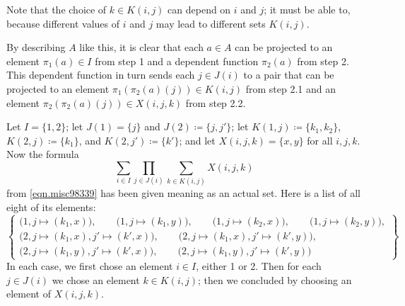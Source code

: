 \documentclass[Book-Poly]{subfiles}
\begin{document}
Note that the choice of $k\in K(i,j)$ can depend on $i$ and $j$; it must be able to, because different values of $i$ and $j$ may lead to different sets $K(i,j)$.

By describing $A$ like this, it is clear that each $a \in A$ can be projected to an element $\pi_1(a) \in I$ from step 1 and a dependent function $\pi_2(a)$ from step 2.
This dependent function in turn sends each $j \in J(i)$ to a pair that can be projected to an element $\pi_1(\pi_2(a)(j)) \in K(i, j)$ from step 2.1 and an element $\pi_2(\pi_2(a)(j)) \in X(i,j,k)$ from step 2.2.

\begin{example}%
\label{ex.notation_sum_prod}

Let $I=\{1,2\}$; let $J(1)=\{j\}$ and $J(2)\coloneqq\{j,j'\}$; let $K(1,j)\coloneqq\{k_1,k_2\}$, $K(2,j)\coloneqq\{k_1\}$, and $K(2,j')\coloneqq\{k'\}$; and let $X(i,j,k)=\{x,y\}$ for all $i,j,k$. Now the formula 
\[\sum_{i\in I}\prod_{j\in J(i)}\sum_{k\in K(i,j)}X(i,j,k)\]
from \eqref{eqn.misc98339} has been given meaning as an actual set. Here is a list of all eight of its elements:
\[
\left\{
\begin{gathered}
	\big(1, j\mapsto(k_1,x)\big),\qquad
	\big(1, j\mapsto(k_1,y)\big),\qquad
	\big(1, j\mapsto(k_2,x)\big),\qquad
	\big(1, j\mapsto(k_2,y)\big),\\
	\big(2, j\mapsto(k_1,x), j'\mapsto(k',x)\big),\qquad
	\big(2, j\mapsto(k_1,x), j'\mapsto(k',y)\big),\\
	\big(2, j\mapsto(k_1,y), j'\mapsto(k',x)\big),\qquad
	\big(2, j\mapsto(k_1,y), j'\mapsto(k',y)\big)
\end{gathered}
\right\}
\]
In each case, we first chose an element $i\in I$, either 1 or 2. Then for each $j\in J(i)$ we chose an element $k\in K(i,j)$; then we concluded by choosing an element of $X(i,j,k)$.
\end{example}
\end{document}
